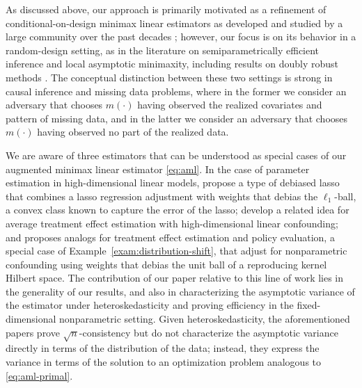 \documentclass[aos,submission]{imsart}
\theoremstyle{plain}
\theoremstyle{remark}
\begin{document}
As discussed above, our approach is primarily motivated as a refinement of conditional-on-design minimax linear estimators as
developed and studied by a large community over the past decades
\citep[e.g.,][]{donoho1994statistical, ibragimov1985nonparametric, juditsky2009nonparametric};
however, our focus is on its behavior in a random-design setting,
as in the literature on semiparametrically efficient inference and local asymptotic minimaxity, including results on doubly robust methods
\citep[e.g.,][]{bickel,robins1,van2006targeted}.
The conceptual distinction between these two settings is strong in causal inference and missing data
problems, where in the former we consider an adversary that chooses $m(\cdot)$ having observed the realized covariates and pattern of missing data,
and in the latter we consider an adversary that chooses $m(\cdot)$ having observed no part of the realized data. 

We are aware of three estimators that can be understood as special cases of our augmented
minimax linear estimator \eqref{eq:aml}.
In the case of parameter estimation in high-dimensional linear models, \citet{javanmard2014confidence}
propose a type of debiased lasso that combines a
lasso regression adjustment with weights that debias the $\ell_1$-ball, a convex class known to
capture the error of the lasso; \citet*{athey2016approximate} develop a related
idea for average treatment effect estimation with high-dimensional linear confounding;
and \citet{kallus2016generalized, kallus2018balanced} proposes analogs
for treatment effect estimation and policy evaluation, a special case of Example~\ref{exam:distribution-shift},
that adjust for nonparametric confounding using weights that debias the unit ball of a reproducing kernel Hilbert space.   
The contribution of our paper
relative to this line of work lies in the generality of our results, and also in characterizing the
asymptotic variance of the estimator under heteroskedasticity and proving efficiency
in the fixed-dimensional nonparametric setting. Given heteroskedasticity, the aforementioned papers
prove $\sqrt{n}$-consistency but do not characterize the asymptotic variance directly in terms of the distribution of the data; 
instead, they express the variance in terms of the solution to an optimization problem analogous to \eqref{eq:aml-primal}.
\end{document}
